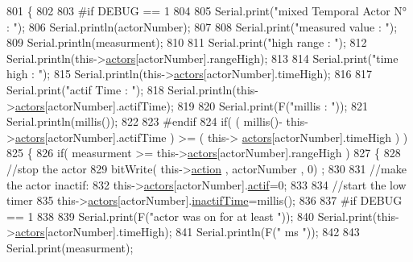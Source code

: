 \begin{DoxyCode}
801 \{
802 
803 \textcolor{preprocessor}{#if DEBUG == 1}
804     
805     Serial.print(\textcolor{stringliteral}{"mixed Temporal Actor N° : "});
806     Serial.println(actorNumber);
807 
808     Serial.print(\textcolor{stringliteral}{"measured value : "});
809     Serial.println(measurment);
810 
811     Serial.print(\textcolor{stringliteral}{"high range : "});
812     Serial.println(this->\hyperlink{class_jetpack_a7e16d2f97837f9712a2e6de1c50d99db}{actors}[actorNumber].rangeHigh);
813 
814     Serial.print(\textcolor{stringliteral}{"time high : "});
815     Serial.println(this->\hyperlink{class_jetpack_a7e16d2f97837f9712a2e6de1c50d99db}{actors}[actorNumber].timeHigh);
816 
817     Serial.print(\textcolor{stringliteral}{"actif Time : "});
818     Serial.println(this->\hyperlink{class_jetpack_a7e16d2f97837f9712a2e6de1c50d99db}{actors}[actorNumber].actifTime);
819 
820     Serial.print(F(\textcolor{stringliteral}{"millis : "}));
821     Serial.println(millis());
822 
823 \textcolor{preprocessor}{#endif}
824     \textcolor{keywordflow}{if}( ( millis()- this->\hyperlink{class_jetpack_a7e16d2f97837f9712a2e6de1c50d99db}{actors}[actorNumber].actifTime  ) >= (  this->
      \hyperlink{class_jetpack_a7e16d2f97837f9712a2e6de1c50d99db}{actors}[actorNumber].timeHigh  ) )
825     \{   
826         \textcolor{keywordflow}{if}( measurment >= this->\hyperlink{class_jetpack_a7e16d2f97837f9712a2e6de1c50d99db}{actors}[actorNumber].rangeHigh )
827         \{
828             \textcolor{comment}{//stop the actor}
829             bitWrite( this->\hyperlink{class_jetpack_aca3142925a7b0834b34ae91d26af7765}{action} , actorNumber , 0) ;
830 
831             \textcolor{comment}{//make the actor inactif:}
832             this->\hyperlink{class_jetpack_a7e16d2f97837f9712a2e6de1c50d99db}{actors}[actorNumber].\hyperlink{struct_jetpack_1_1state_aa177541689bbaea21a4650a083b0df77}{actif}=0;
833 
834             \textcolor{comment}{//start the low timer}
835             this->\hyperlink{class_jetpack_a7e16d2f97837f9712a2e6de1c50d99db}{actors}[actorNumber].\hyperlink{struct_jetpack_1_1state_aaf817b1f9e7a4d65b9e3ca4726b281f6}{inactifTime}=millis();
836 
837 \textcolor{preprocessor}{        #if DEBUG == 1 }
838 
839             Serial.print(F(\textcolor{stringliteral}{"actor was on for at least "}));
840             Serial.print(this->\hyperlink{class_jetpack_a7e16d2f97837f9712a2e6de1c50d99db}{actors}[actorNumber].timeHigh);
841             Serial.println(F(\textcolor{stringliteral}{" ms "}));
842 
843             Serial.print(measurment);

\end{DoxyCode}
